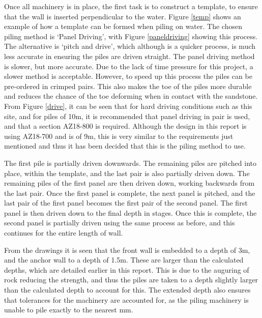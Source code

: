 \documentclass[12pt, a4paper]{article}
\begin{document}
\begin{justify}
Once all machinery is in place, the first task is to construct a template, to ensure that the wall is inserted perpendicular to the water. Figure \ref{temp} shows an example of how a template can be formed when piling on water. The chosen piling method is `Panel Driving', with Figure \ref{paneldriving} showing this process. The alternative is `pitch and drive', which although is a quicker process, is much less accurate in ensuring the piles are driven straight. The panel driving method is slower, but more accurate. Due to the lack of time pressure for this project, a slower method is acceptable. However, to speed up this process the piles can be pre-ordered in crimped pairs. This also makes the toe of the piles more durable and reduces the chance of the toe deforming when in contact with the sandstone. From Figure \ref{drive}, it can be seen that for hard driving conditions such as this site, and for piles of 10m, it is recommended that panel driving in pair is used, and that a section AZ18-800 is required. Although the design in this report is using AZ18-700 and is of 9m, this is very similar to the requirements just mentioned and thus it has been decided that this is the piling method to use. 
\end{justify}
\begin{justify}
The first pile is partially driven downwards. The remaining piles are pitched into place, within the template, and the last pair is also partially driven down. The remaining piles of the first panel are then driven down, working backwards from the last pair. Once the first panel is complete, the next panel is pitched, and the last pair of the first panel becomes the first pair of the second panel. The first panel is then driven down to the final depth in stages. Once this is complete, the second panel is partially driven using the same process as before, and this continues for the entire length of wall.
\end{justify}
\begin{justify}
From the drawings it is seen that the front wall is embedded to a depth of 3m, and the anchor wall to a depth of 1.5m. These are larger than the calculated depths, which are detailed earlier in this report. This is due to the auguring of rock reducing the strength, and thus the piles are taken to a depth slightly larger than the calculated depth to account for this. The extended depth also ensures that tolerances for the machinery are accounted for, as the piling machinery is unable to pile exactly to the nearest mm. 
\end{justify}
\end{document}
